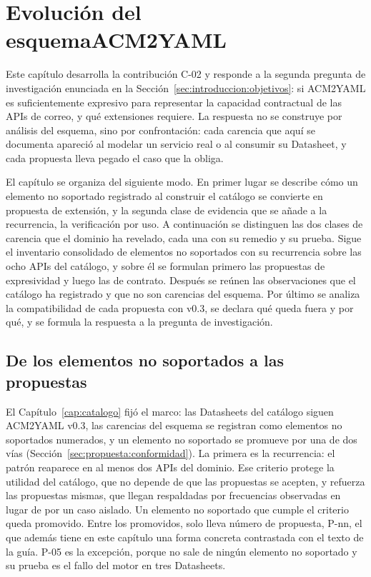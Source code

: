 \chapter[Evolución del esquema ACM2YAML]{Evolución del esquema\newline ACM2YAML}
\label{cap:evolucion}

Este capítulo desarrolla la contribución C-02 y responde a la segunda pregunta
de investigación enunciada en la Sección~\ref{sec:introduccion:objetivos}: si
ACM2YAML es suficientemente expresivo para representar la capacidad contractual
de las APIs de correo, y qué extensiones requiere. La respuesta no se construye
por análisis del esquema, sino por confrontación: cada carencia que aquí se
documenta apareció al modelar un servicio real o al consumir su Datasheet, y cada propuesta lleva pegado
el caso que la obliga.

El capítulo se organiza del siguiente modo.
En primer lugar se describe cómo un elemento no soportado registrado al construir el catálogo se convierte en propuesta de extensión, y la segunda clase de evidencia que se añade a la recurrencia, la verificación por uso.
A continuación se distinguen las dos clases de carencia que el dominio ha revelado, cada una con su remedio y su prueba.
Sigue el inventario consolidado de elementos no soportados con su recurrencia sobre las ocho APIs del catálogo, y sobre él se formulan primero las propuestas de expresividad y luego las de contrato.
Después se reúnen las observaciones que el catálogo ha registrado y que no son carencias del esquema.
Por último se analiza la compatibilidad de cada propuesta con v0.3, se declara qué queda fuera y por qué, y se formula la respuesta a la pregunta de investigación.

\section{De los elementos no soportados a las propuestas}
\label{sec:evolucion:metodo}

El Capítulo~\ref{cap:catalogo} fijó el marco: las Datasheets del catálogo siguen ACM2YAML v0.3, las carencias del esquema se registran como elementos no soportados numerados, y un elemento no soportado se promueve por una de dos vías (Sección~\ref{sec:propuesta:conformidad}).
La primera es la recurrencia: el patrón reaparece en al menos dos APIs del dominio.
Ese criterio protege la utilidad del catálogo, que no depende de que las propuestas se acepten, y refuerza las propuestas mismas, que llegan respaldadas por frecuencias observadas en lugar de por un caso aislado.
Un elemento no soportado que cumple el criterio queda promovido.
Entre los promovidos, solo lleva número de propuesta, P-nn, el que además tiene en este capítulo una forma concreta contrastada con el texto de la guía.
P-05 es la excepción, porque no sale de ningún elemento no soportado y su prueba es el fallo del motor en tres Datasheets.

